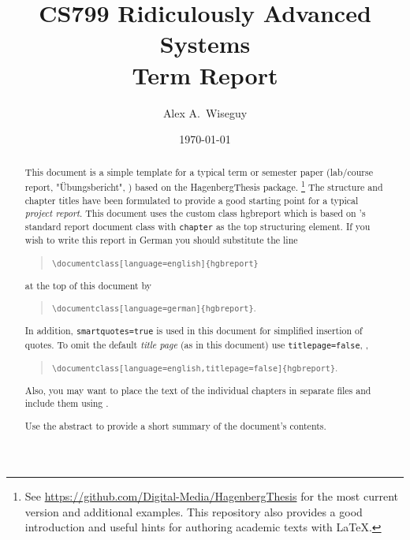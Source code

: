 \documentclass[language=english,titlepage=false,smartquotes=true]{hgbreport}
\begin{document}

\author{Alex A.\ Wiseguy}                    %
\title{CS799 Ridiculously Advanced Systems\\ %
			Term Report}	                 %
\date{\today}

\maketitle

\begin{abstract}\noindent
This document is a simple template for a typical term or semester paper
(lab/course report, "Übungsbericht", \etc) based on the \textsf{HagenbergThesis}
\latex package.%
\footnote{See \url{https://github.com/Digital-Media/HagenbergThesis} for the
	most current version and additional examples. This repository also provides
	a good introduction and useful hints for authoring academic texts with
	LaTeX.}
The structure and chapter titles have been formulated to provide a good
starting point for a typical \emph{project report}. This document uses the
custom class \textsf{hgbreport} which is based on \latex's standard
\textsf{report} document class with \texttt{chapter} as the top structuring
element. If you wish to write this report in German you should substitute the
line
%
\begin{quote}
	\verb!\documentclass[language=english]{hgbreport}!
\end{quote}
%
at the top of this document by
%
\begin{quote}
	\verb!\documentclass[language=german]{hgbreport}!.
\end{quote}
%
In addition, \texttt{smartquotes=true} is used in this document
for simplified insertion of quotes. To omit the default \emph{title page}
(as in this document) use \texttt{titlepage=false}, \eg,
%
\begin{quote}
	\verb!\documentclass[language=english,titlepage=false]{hgbreport}!.
\end{quote}
%
Also, you may want to place the text of the individual chapters in separate
files and include them using \verb!!.

\bigskip
\noindent
Use the abstract to provide a short summary of the document's contents.
\end{abstract}
\end{document}
